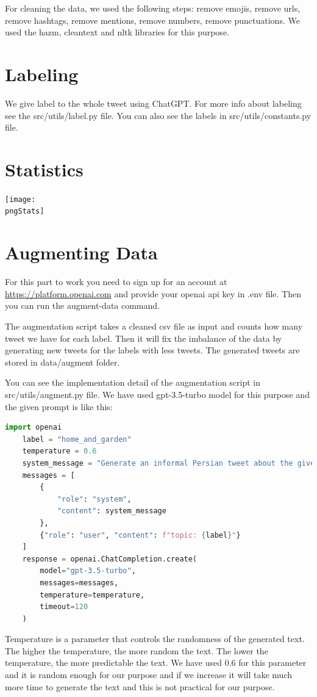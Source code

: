 \documentclass[12pt, letterpaper]{article}
\def\timestamp{2023-06-02-10-27-57}
\def\rootDir{../..}
\def\csvStats{\rootDir/stats/stats_\timestamp.csv}
\def\pngStats{\rootDir/stats/plot_\timestamp.png}
\begin{document}
    For cleaning the data, we used the following steps: remove emojis, remove urls, remove hashtags, remove mentions, remove numbers, remove punctuations. We used the hazm, cleantext and nltk libraries for this purpose.


    \section{Labeling}\label{sec:labeling}
    We give label to the whole tweet using ChatGPT. For more info about labeling see the src\slash utils\slash label.py file. You can also see the labels in src\slash utils\slash constants.py file.


    \section{Statistics}\label{sec:statistics}
    \csvautotabular{\csvStats}
    \begin{center}
        \texttt{[image: \\pngStats]}
    \end{center}


    \section{Augmenting Data}\label{sec:augmenting-data}
    For this part to work you need to sign up for an account at \url{https://platform.openai.com} and provide your openai api key in .env file. Then you can run the augment-data command.

    The augmentation script takes a cleaned csv file as input and counts how many tweet we have for each label. Then it will fix the imbalance of the data by generating new tweets for the labels with less tweets. The generated tweets are stored in data\slash augment folder.

    You can see the implementation detail of the augmentation script in src\slash utils\slash augment.py file. We have used gpt-3.5-turbo model for this purpose and the given prompt is like this:
    \begin{lstlisting}[language=Python]
    import openai
    label = "home_and_garden"
    temperature = 0.6
    system_message = "Generate an informal Persian tweet about the given topic without any hashtags, mentions, links, or emojis."  # noqa
    messages = [
        {
            "role": "system",
            "content": system_message
        },
        {"role": "user", "content": f"topic: {label}"}
    ]
    response = openai.ChatCompletion.create(
        model="gpt-3.5-turbo",
        messages=messages,
        temperature=temperature,
        timeout=120
    )
    \end{lstlisting}
    Temperature is a parameter that controls the randomness of the generated text. The higher the temperature, the more random the text. The lower the temperature, the more predictable the text. We have used 0.6 for this parameter and it is random enough for our purpose and if we increase it will take much more time to generate the text and this is not practical for our purpose.
\end{document}
